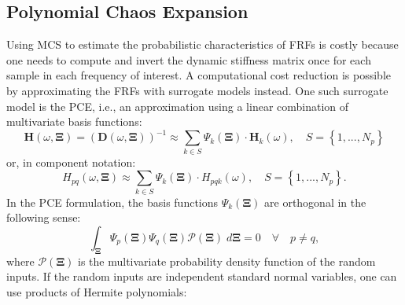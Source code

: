 %
%

\subsection{Polynomial Chaos Expansion}
\label{ssec: PCE}

Using MCS to estimate the probabilistic characteristics of FRFs is costly because one needs to compute and invert the dynamic stiffness matrix once for each sample in each frequency of interest.
A computational cost reduction is possible by approximating the FRFs with surrogate models instead.
{One such surrogate model is the PCE, i.e., an approximation using a linear combination of multivariate basis functions:}%
\begin{equation}
    \mathbf{H} \left( \omega, \mathbf{\Xi} \right)
    =
    \left(
        \mathbf{D} \left(\omega, \mathbf{\Xi}\right)
    \right)^{-1}
    \approx
    \sum_{k\in S}{
        \Psi_{k} \left(\mathbf{\Xi}\right)
        \cdot
        \mathbf{H}_{k} \left(\omega\right)
    },
    \quad
    S = \left\{1, ..., N_{p}\right\}
    \label{PCE_approx1}
\end{equation}
{or, in component notation:}%
\begin{equation}
    H_{pq} \left(\omega, \mathbf{\Xi}\right)
    \approx
    \sum_{k\in S}{
        \Psi_{k} \left(\mathbf{\Xi}\right)
        \cdot
        H_{pqk} \left(\omega\right)
    },
    \quad
    S = \left\{1, ..., N_{p}\right\}.
    \label{PCE_approx2}
\end{equation}
{In the PCE formulation, the basis functions $\Psi_{k}\left(\mathbf{\Xi}\right)$ are orthogonal in the following sense:}%
\begin{equation}
    \int_{\mathbf{\Xi}}{
        \Psi_{p} \left( \mathbf{\Xi} \right)
        \Psi_{q} \left( \mathbf{\Xi} \right)
        \mathcal{P} \left( \mathbf{\Xi} \right)
        \;
        d\mathbf{\Xi}
    }
    =
    0
    \quad
    \forall
    \quad
    p \neq q,
\end{equation}
where $\mathcal{P} \left( \mathbf{\Xi} \right)$ is the multivariate probability density function of the random inputs.
{If the random inputs are independent standard normal variables, one can use products of Hermite polynomials:}%
